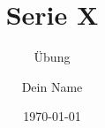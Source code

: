 \documentclass{HtwkAssignment}
\title{Serie X}
\subtitle{Übung}
\author{Dein Name}
\date{\today}
\begin{document}
	\Blinddocument
\end{document}
